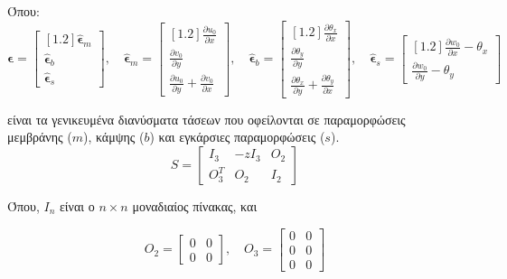 Όπου:
$$
    \boldsymbol{\epsilon} =
    \begin{bmatrix}[1.2]
    \widehat{\boldsymbol{\epsilon}}_{m} \\
    \widehat{\boldsymbol{\epsilon}}_{b} \\
    \widehat{\boldsymbol{\epsilon}}_{s}
    \end{bmatrix}, \quad
    \widehat{\boldsymbol{\epsilon}}_{m} =
    \begin{bmatrix}[1.2]
    \frac{\partial u_{0}}{\partial x} \\
    \frac{\partial v_{0}}{\partial y} \\
    \frac{\partial u_{0}}{\partial y} + \frac{\partial v_{0}}{\partial x}
    \end{bmatrix}, \quad
    \widehat{\boldsymbol{\epsilon}}_{b} =
    \begin{bmatrix}[1.2]
    \frac{\partial\theta_{x}}{\partial x} \\
    \frac{\partial\theta_{y}}{\partial y} \\
    \frac{\partial\theta_{x}}{\partial y} + \frac{\partial\theta_{y}}{\partial x}
    \end{bmatrix}, \quad
    \widehat{\boldsymbol{\epsilon}}_{s} =
    \begin{bmatrix}[1.2]
    \frac{\partial w_{0}}{\partial x} - \theta_{x} \\
    \frac{\partial w_{0}}{\partial y} - \theta_{y}
    \end{bmatrix}
$$

είναι τα γενικευμένα διανύσματα τάσεων που οφείλονται σε παραμορφώσεις μεμβράνης ($m$), κάμψης ($b$) και εγκάρσιες  παραμορφώσεις ($s$).
\begin{equation}
    S =
    \begin{bmatrix}
    I_{3} & - z I_{3} & O_{2} \\[5pt]
    O_{3}^{T} & O_{2} & I_{2}
    \end{bmatrix}
\end{equation}

Όπου, $ I_{n} $ είναι ο $n \times n$ μοναδιαίος πίνακας, και

\[
O_{2} =
\begin{bmatrix}
0 & 0 \\
0 & 0
\end{bmatrix}, \quad
O_{3} =
\begin{bmatrix}
0 & 0 \\
0 & 0 \\
0 & 0
\end{bmatrix}
\]


